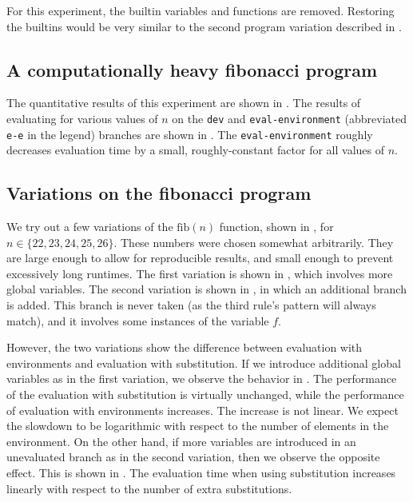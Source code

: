 For this experiment, the builtin variables and functions are removed. Restoring the builtins would be very similar to the second program variation described in .

\subsection{A computationally heavy fibonacci program}
\label{sec:eval-fib}

The quantitative results of this experiment are shown in . The results of evaluating  for various values of $n$ on the \texttt{dev} and \texttt{eval-environment} (abbreviated \texttt{e-e} in the legend) branches are shown in . The \texttt{eval-environment} roughly decreases evaluation time by a small, roughly-constant factor for all values of $n$.

\subsection{Variations on the fibonacci program}
\label{sec:eval-fib-variations}

We try out a few variations of the $\text{fib}(n)$ function, shown in , for $n\in\{22,23,24,25,26\}$. These numbers were chosen somewhat arbitrarily. They are large enough to allow for reproducible results, and small enough to prevent excessively long runtimes. The first variation is shown in , which involves more global variables. The second variation is shown in , in which an additional branch is added. This branch is never taken (as the third rule's pattern will always match), and it involves some instances of the variable $f$.

However, the two variations show the difference between evaluation with environments and evaluation with substitution. If we introduce additional global variables as in the first variation, we observe the behavior in . The performance of the evaluation with substitution is virtually unchanged, while the performance of evaluation with environments increases. The increase is not linear. We expect the slowdown to be logarithmic with respect to the number of elements in the environment. On the other hand, if more variables are introduced in an unevaluated branch as in the second variation, then we observe the opposite effect. This is shown in . The evaluation time when using substitution increases linearly with respect to the number of extra substitutions.

